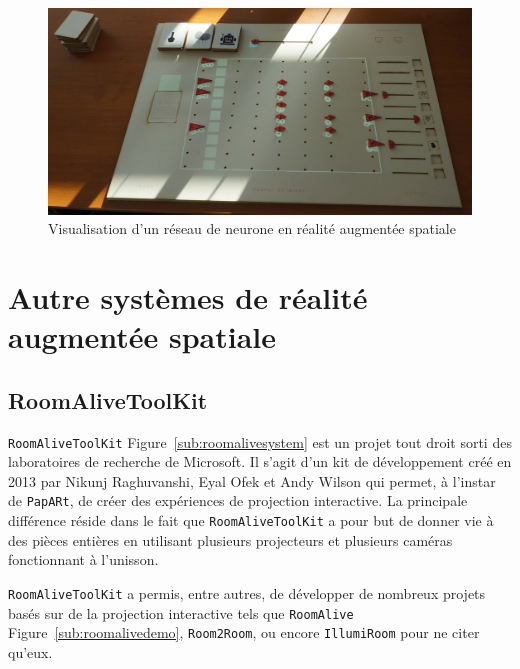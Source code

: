 \begin{figure}[H]
\centering
\includegraphics[width=0.65\linewidth]{images/neural-network}
\caption{Visualisation d'un réseau de neurone en réalité augmentée spatiale\protect\footnotemark}
\label{fig:neuralnetwork}
\end{figure}


\section{Autre systèmes de réalité augmentée spatiale}
\label{sec:SARother}

\subsection{RoomAliveToolKit} 
\texttt{RoomAliveToolKit}\cite{Jones:2014:RME:2642918.2647383} Figure~\ref{sub:roomalivesystem} est un projet tout droit sorti des laboratoires de recherche de Microsoft. Il s'agit d'un kit de développement créé en 2013 par Nikunj Raghuvanshi, Eyal Ofek et Andy Wilson qui permet, à l'instar de \texttt{\texttt{PapARt}}, de créer des expériences de projection interactive. La principale différence réside dans le fait que \texttt{RoomAliveToolKit} a pour but de donner vie à des pièces entières en utilisant plusieurs projecteurs et plusieurs caméras fonctionnant à l'unisson.

\texttt{RoomAliveToolKit} a permis, entre autres, de développer de nombreux projets basés sur de la projection interactive tels que \texttt{RoomAlive} Figure~\ref{sub:roomalivedemo}, \texttt{Room2Room}, ou encore \texttt{IllumiRoom} pour ne citer qu'eux.

